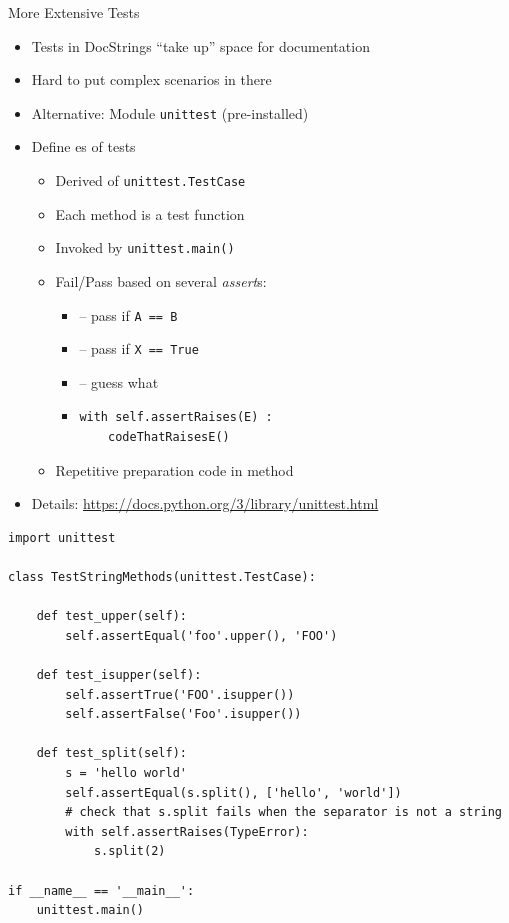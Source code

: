 
\begin{frame}[fragile]{More Extensive Tests}
%
\begin{itemize}
\item Tests in DocStrings \enquote{take up} space for documentation
\item Hard to put complex scenarios in there
\item Alternative: Module \texttt{unittest} (pre-installed)
\item Define es of tests
	\begin{itemize}
	\item Derived of \texttt{unittest.TestCase}
	\item Each method is a test function
	\item Invoked by \texttt{unittest.main()}
	\item Fail/Pass based on several \emph{assert}s:
		\begin{itemize}
		\item {} -- pass if \texttt{A == B}
		\item {} -- pass if \texttt{X == True}
		\item {} -- guess what
		\item
\begin{verbatim}
with self.assertRaises(E) :
    codeThatRaisesE()
\end{verbatim}
		\end{itemize}
	\item Repetitive preparation code in method 
	\end{itemize}
\item Details: \url{https://docs.python.org/3/library/unittest.html}
\end{itemize}
%
\end{frame}


\begin{frame}[fragile]
%
\begin{codebox}
\begin{verbatim}
import unittest

class TestStringMethods(unittest.TestCase):

    def test_upper(self):
        self.assertEqual('foo'.upper(), 'FOO')

    def test_isupper(self):
        self.assertTrue('FOO'.isupper())
        self.assertFalse('Foo'.isupper())

    def test_split(self):
        s = 'hello world'
        self.assertEqual(s.split(), ['hello', 'world'])
        # check that s.split fails when the separator is not a string
        with self.assertRaises(TypeError):
            s.split(2)

if __name__ == '__main__':
    unittest.main()
\end{verbatim}
\end{codebox}
%
\end{frame}

